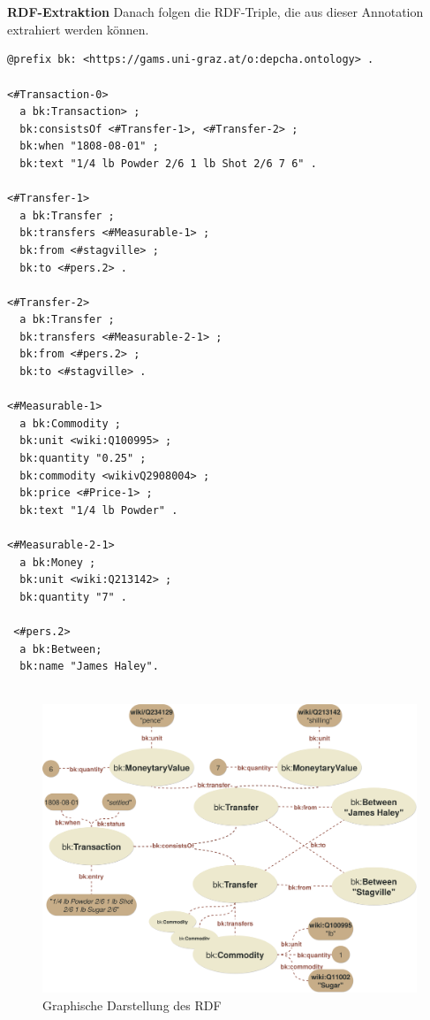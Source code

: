 \documentclass[12pt,a4paper]{article}
\begin{document}
\\
\\
\textbf{RDF-Extraktion}
Danach folgen die RDF-Triple, die aus dieser Annotation extrahiert werden können.
\begin{lstlisting}[]
@prefix bk: <https://gams.uni-graz.at/o:depcha.ontology> .

<#Transaction-0>
  a bk:Transaction> ;
  bk:consistsOf <#Transfer-1>, <#Transfer-2> ;
  bk:when "1808-08-01" ;
  bk:text "1/4 lb Powder 2/6 1 lb Shot 2/6 7 6" .

<#Transfer-1>
  a bk:Transfer ;
  bk:transfers <#Measurable-1> ;
  bk:from <#stagville> ;
  bk:to <#pers.2> .

<#Transfer-2>
  a bk:Transfer ;
  bk:transfers <#Measurable-2-1> ;
  bk:from <#pers.2> ;
  bk:to <#stagville> .

<#Measurable-1>
  a bk:Commodity ;
  bk:unit <wiki:Q100995> ;
  bk:quantity "0.25" ;
  bk:commodity <wikivQ2908004> ;
  bk:price <#Price-1> ;
  bk:text "1/4 lb Powder" .

<#Measurable-2-1>
  a bk:Money ;
  bk:unit <wiki:Q213142> ;
  bk:quantity "7" .
  
 <#pers.2>
  a bk:Between;
  bk:name "James Haley".
  
\end{lstlisting}

\begin{figure}[H]
\centering
	\includegraphics[width=1\textwidth]{img/example.png}  
    \caption[Graphische Darstellung des RDF, eigene Darstellung, 01.06.2019.]{Graphische Darstellung des RDF} \label{fig:example}
\end{figure}
\end{document}
